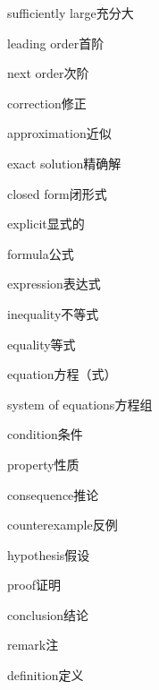 \begin{multicols}{2}
sufficiently large\hspace{0.9em}充分大\par
leading order\hspace{0.9em}首阶\par
next order\hspace{0.9em}次阶\par
correction\hspace{0.9em}修正\par
approximation\hspace{0.9em}近似\par
exact solution\hspace{0.9em}精确解\par
closed form\hspace{0.9em}闭形式\par
explicit\hspace{0.9em}显式的\par
formula\hspace{0.9em}公式\par
expression\hspace{0.9em}表达式\par
inequality\hspace{0.9em}不等式\par
equality\hspace{0.9em}等式\par
equation\hspace{0.9em}方程（式）\par
system of equations\hspace{0.9em}方程组\par
condition\hspace{0.9em}条件\par
property\hspace{0.9em}性质\par
consequence\hspace{0.9em}推论\par
counterexample\hspace{0.9em}反例\par
hypothesis\hspace{0.9em}假设\par
proof\hspace{0.9em}证明\par
conclusion\hspace{0.9em}结论\par
remark\hspace{0.9em}注\par
definition\hspace{0.9em}定义\par

\end{multicols}
